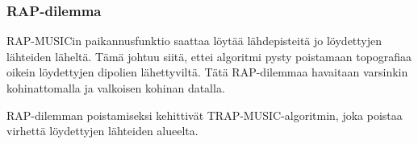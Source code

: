 \subsubsection{RAP-dilemma}
RAP-MUSICin paikannusfunktio saattaa löytää lähdepisteitä jo löydettyjen lähteiden läheltä. Tämä johtuu siitä, ettei algoritmi pysty poistamaan topografiaa oikein löydettyjen dipolien lähettyviltä. Tätä RAP-dilemmaa havaitaan varsinkin kohinattomalla ja valkoisen kohinan datalla. \citep{Makela2018TruncatedLocalization} 

RAP-dilemman poistamiseksi \cite{Makela2018TruncatedLocalization} kehittivät TRAP-MUSIC-algoritmin, joka poistaa virhettä löydettyjen lähteiden alueelta.